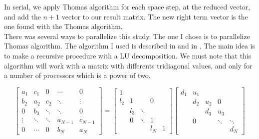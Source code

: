 \documentclass{article}
\begin{document}
                    In serial, we apply Thomas algorithm for each space step, at the reduced vector, and add the $n+1$ vector to our 
                    result matrix. The new right term vector is the one found with the Thomas algorithm.\\
                    There was several ways to parallelize this study. The one I chose is to
                    parallelize Thomas algorithm. The algorithm I used is described in \cite{thomasalg1}
                    and in \cite{thomasalg2}. The main idea is to make a recursive procedure with a LU decomposition.
                    We must note that this algorithm will work with a matrix with differents tridiagonal values, and only for
                    a number of processors which is a power of two.

                    \begin{equation}
                        \label{eq:laaslu}
                        \begin{bmatrix}
                            a_{1}  & c_{1}  & 0      & \cdots & 0 \\
                            b_{2}  & a_{2}  & c_{2}  & \ddots & \vdots \\
                            0      & b_{3}  & \ddots & \ddots & 0 \\
                            \vdots & \ddots & \ddots & a_{N-1}& c_{N-1}\\
                            0      & \cdots & 0      & b_{N}  & a_{N}
                        \end{bmatrix}
                        =
                        \begin{bmatrix}
                            1      &        &        &        &  \\
                             l_{2} & 1      &        &   0    &  \\
                                   &  l_{3} & \ddots &        & \\
                                   & 0      & \ddots & 1      & \\
                                   &        &        & l_{N}  & 1
                        \end{bmatrix}
                        \begin{bmatrix}
                            d_{1}  &  u_{1} &        &        &  \\
                                   & d_{2}  & u_{2}  &  0     &  \\
                                   &        & d_{3}  & u_{3} & \\
                                   & 0      &        & \ddots  & \ddots\\
                                   &        &        &        & d_{N}
                        \end{bmatrix}
                    \end{equation}
\end{document}
